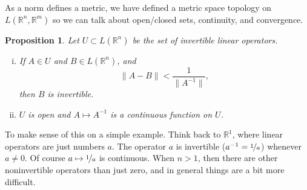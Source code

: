 \documentclass[12pt]{book}
\newcommand{\snorm}[1]{\lVert {#1} \rVert}
\newcommand{\R}{{\mathbb{R}}}
\theoremstyle{plain}
\newtheorem{prop}[thm]{Proposition}
\theoremstyle{remark}
\theoremstyle{definition}
\theoremstyle{exercise}
\theoremstyle{example}
\begin{document}
As a norm defines a metric,
we have defined a metric space topology on $L(\R^n,\R^m)$ so we can talk
about open/closed sets, continuity, and convergence.

\begin{prop} \label{prop:finitedimpropinv}
Let $U \subset L(\R^n)$ be the set of invertible linear operators.
\begin{enumerate}[(i)]
\item \label{finitedimpropinv:i}
If $A \in U$ and $B \in L(\R^n)$, and
\begin{equation} \label{eqcontineq}
\snorm{A-B} <  \frac{1}{\snorm{A^{-1}}},
\end{equation}
then $B$ is invertible.
\item \label{finitedimpropinv:ii}
$U$ is open and $A \mapsto A^{-1}$ is a continuous
function on $U$.
\end{enumerate}
\end{prop}


To make sense of this on a simple example.
Think back to $\R^1$, where linear operators are just
numbers $a$.  The operator $a$ is invertible ($a^{-1} = \nicefrac{1}{a}$)
whenever $a \not=0$.  Of course $a \mapsto \nicefrac{1}{a}$ is continuous.
When $n > 1$, then there are other noninvertible operators than just zero,
and in general things are a bit more difficult.
\end{document}
